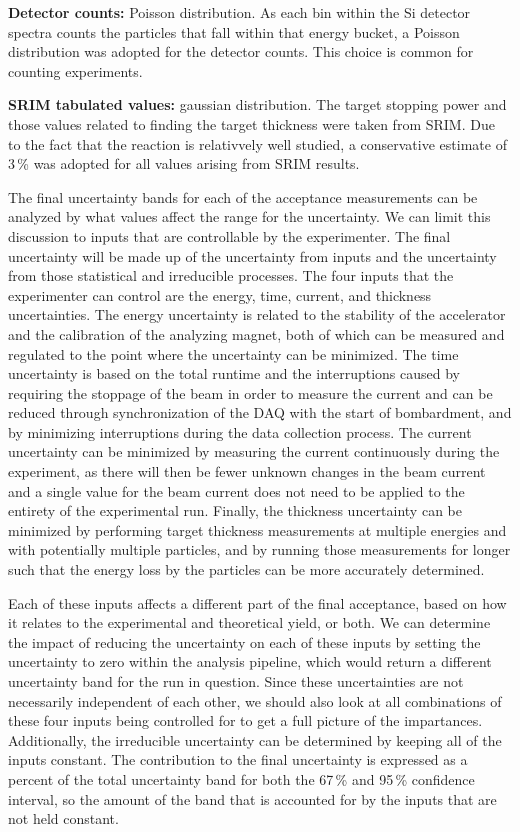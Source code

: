 \textbf{Detector counts:} Poisson distribution. As each bin within the
Si detector spectra counts the particles that fall within that energy
bucket, a Poisson distribution was adopted for the detector counts. This
choice is common for counting experiments.

\textbf{SRIM tabulated values:} gaussian distribution. The target
stopping power and those values related to finding the target thickness
were taken from SRIM. Due to the fact that the \alpa{} reaction is
relativvely well studied, a conservative estimate of 3\,\% was adopted
for all values arising from SRIM results.

The final uncertainty bands for each of the acceptance measurements can
be analyzed by what values affect the range for the uncertainty. We can
limit this discussion to inputs that are controllable by the
experimenter. The final uncertainty will be made up of the uncertainty
from inputs and the uncertainty from those statistical and irreducible
processes. The four inputs that the experimenter can control are the
energy, time, current, and thickness uncertainties. The energy
uncertainty is related to the stability of the accelerator and the
calibration of the analyzing magnet, both of which can be measured and
regulated to the point where the uncertainty can be minimized. The time
uncertainty is based on the total runtime and the interruptions caused
by requiring the stoppage of the beam in order to measure the current
and can be reduced through synchronization of the DAQ with the start of
bombardment, and by minimizing interruptions during the data collection
process. The current uncertainty can be minimized by measuring the
current continuously during the experiment, as there will then be fewer
unknown changes in the beam current and a single value for the beam
current does not need to be applied to the entirety of the experimental
run. Finally, the thickness uncertainty can be minimized by performing
target thickness measurements at multiple energies and with potentially
multiple particles, and by running those measurements for longer such
that the energy loss by the particles can be more accurately determined.

Each of these inputs affects a different part of the final acceptance,
based on how it relates to the experimental and theoretical yield, or
both. We can determine the impact of reducing the uncertainty on each of
these inputs by setting the uncertainty to zero within the analysis
pipeline, which would return a different uncertainty band for the run in
question. Since these uncertainties are not necessarily independent of
each other, we should also look at all combinations of these four inputs
being controlled for to get a full picture of the impartances.
Additionally, the irreducible uncertainty can be determined by keeping
all of the inputs constant. The contribution to the final uncertainty is
expressed as a percent of the total uncertainty band for both the 67\,\%
and 95\,\% confidence interval, so the amount of the band that is
accounted for by the inputs that are not held constant.

